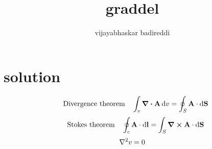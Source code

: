 \documentclass[12pt]{article}
\title{graddel}
\author{vijayabhaskar badireddi}
\begin{document}

\section*{solution}
\[\qq{Divergence theorem}\int_{v}\div{\vb{A}\dd{v}}=\oint_{S}\vb{A}\cdot\dd{\vb{S}}\]
\[\qq{Stokes theorem}\oint_c\vb{A}\cdot\dd{\vb{l}}=\int_S\curl{\vb{A}}\cdot\dd{\vb{S}}\]
\[\laplacian{v}=0\]
\end{document}
